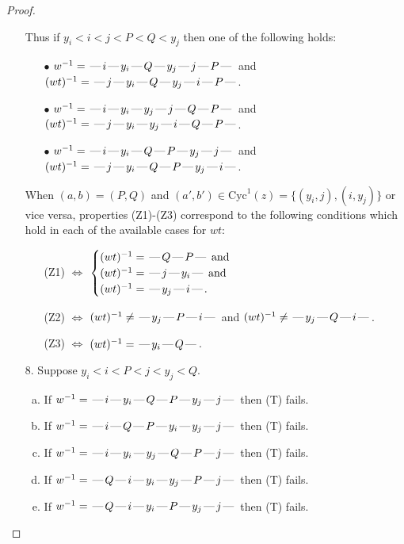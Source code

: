 \documentclass[10pt]{article}
\theoremstyle{definition}
\theoremstyle{definition}
\def\dash{\text{\hspace{0.5mm}---\hspace{0.5mm}}}
\def\Cyc{\mathrm{Cyc}}
\begin{document}
\begin{proof}
\begin{enumerate}
\begin{enumerate}[(a)]
\end{enumerate}
Thus if $y_i < i < j < P < Q < y_j$ then one of the following holds:
\begin{enumerate}
\item[$\bullet$] $w^{-1} = \dash i\dash y_i\dash Q\dash y_j\dash j\dash P\dash $ and $(wt)^{-1} = \dash j\dash y_i\dash Q\dash y_j\dash i\dash P\dash $.
\item[$\bullet$] $w^{-1} = \dash i\dash y_i\dash y_j\dash j\dash Q\dash P\dash $ and $(wt)^{-1} = \dash j\dash y_i\dash y_j\dash i\dash Q\dash P\dash $.
\item[$\bullet$] $w^{-1} = \dash i\dash y_i\dash Q\dash P\dash y_j\dash j\dash $ and $(wt)^{-1} = \dash j\dash y_i\dash Q\dash P\dash y_j\dash i\dash $.
\end{enumerate}
When $(a,b)= (P,Q)$ and $(a',b')\in \Cyc^1(z)=\{(y_i,j),(i,y_j)\}$ or vice versa,
properties (Z1)-(Z3) correspond to the following conditions which
hold in each of the available cases for $wt$:
\begin{enumerate}
\item[](Z1) $\Leftrightarrow$ $\begin{cases}\text{$(wt)^{-1} = \dash Q \dash P \dash$}\text{ and }\\
\text{$(wt)^{-1} = \dash j \dash y_i \dash$}\text{ and }\\
\text{$(wt)^{-1} = \dash y_j \dash i \dash$}.\end{cases}$
\item[](Z2) $\Leftrightarrow$ $(wt)^{-1} \neq \dash y_j \dash P \dash i \dash$ and $(wt)^{-1}\neq \dash y_j \dash Q \dash i \dash$.
\item[](Z3) $\Leftrightarrow$ $(wt)^{-1} = \dash y_i \dash Q \dash$.
\end{enumerate}
\item[$8$.] Suppose $y_i < i < P < j < y_j < Q$.
\begin{enumerate}[(a)]
\item If $w^{-1} = \dash i\dash y_i\dash Q\dash P\dash y_j\dash j\dash $ then (T) fails.
\item If $w^{-1} = \dash i\dash Q\dash P\dash y_i\dash y_j\dash j\dash $ then (T) fails.
\item If $w^{-1} = \dash i\dash y_i\dash y_j\dash Q\dash P\dash j\dash $ then (T) fails.
\item If $w^{-1} = \dash Q\dash i\dash y_i\dash y_j\dash P\dash j\dash $ then (T) fails.
\item If $w^{-1} = \dash Q\dash i\dash y_i\dash P\dash y_j\dash j\dash $ then (T) fails.

\end{enumerate}
\end{enumerate}
\end{proof}
\end{document}
